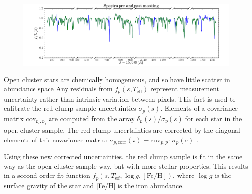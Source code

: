 \documentclass[preprint]{aastex}
\begin{document}
\begin{figure}[H]
\centering
\includegraphics[width = \linewidth]{examplespectrum.png}
\caption{}
\label{fig:spectra}
\end{figure}


Open cluster stars are chemically homogeneous, and so have little scatter in abundance space \citep{openclusters} Any residuals from $f_p(s,T_{\mathrm{eff}})$ represent measurement uncertainty rather than intrinsic variation between pixels. This fact is used to calibrate the red clump sample uncertainties $\sigma_p(s)$. Elements of a covariance matrix $\mathrm{cov}_{p_i,p_j}$ are computed from the array $\delta_p(s)/\sigma_p(s)$ for each star in the open cluster sample. The red clump uncertainties are corrected by the diagonal elements of this covariance matrix: $\sigma_{p,\mathrm{corr}}(s) = \mathrm{cov}_{p,p}\cdot\sigma_{p}(s)$ .  

Using these new corrected uncertainties, the red clump sample is fit in the same way as the open cluster sample way, but with more stellar properties. This results in a second order fit function $f_p(s,T_{\mathrm{eff}},\log g, [\mathrm{Fe/H}])$, where $\log g$ is the surface gravity of the star and [Fe/H] is the iron abundance.




\end{document}
